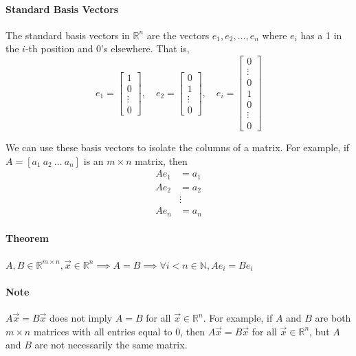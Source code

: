 \paragraph*{Standard Basis Vectors}
The standard basis vectors in $\mathbb{R}^n$ are the vectors $e_1, e_2, \ldots, e_n$ where $e_i$ has a 1 in the $i$-th position and 0's elsewhere. That is,
\[e_1 = \begin{bmatrix}
    1 \\
    0 \\
    \vdots \\
    0
\end{bmatrix}, \quad e_2 = \begin{bmatrix}
    0 \\
    1 \\
    \vdots \\
    0
\end{bmatrix}, \quad e_i = \begin{bmatrix}
    0 \\
    \vdots \\
    0 \\
    1 \\
    0 \\
    \vdots \\
    0
\end{bmatrix}\]

We can use these basis vectors to isolate the columns of a matrix. For example, if $A = [a_1 \ a_2 \ \ldots \ a_n]$ is an $m \times n$ matrix, then
\begin{align*}
Ae_1 &= a_1 \\
Ae_2 &= a_2 \\
&\vdots \\
Ae_n &= a_n
\end{align*} 

\paragraph*{Theorem}
$A, B \in \mathbb{R}^{m \times n}, \vec{x} \in \mathbb{R}^n \implies A=B \implies \forall i < n \in \mathbb{N}, Ae_i = Be_i$

\paragraph*{Note}
$A\vec{x} = B\vec{x}$ does not imply $A = B$ for all $\vec{x} \in \mathbb{R}^n$. For example, if $A$ and $B$ are both $m \times n$ matrices with all entries equal to 0, then $A\vec{x} = B\vec{x}$ for all $\vec{x} \in \mathbb{R}^n$, but $A$ and $B$ are not necessarily the same matrix.

